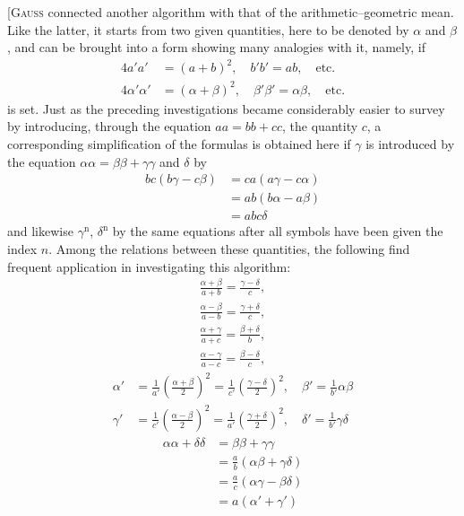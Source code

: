 
[\textsc{Gauss} connected another algorithm with that of the arithmetic–geometric mean. Like the latter, it starts from two given quantities, here to be denoted by $\alpha$ and $\beta$, and can be brought into a form showing many analogies with it, namely, if
\[
\begin{aligned}
4a'a'&=(a+b)^2,\quad b'b'=ab,\quad\text{etc.}\\
4\alpha'\alpha'&=(\alpha+\beta)^2,\quad\beta'\beta'=\alpha\beta,\quad\text{etc.}
\end{aligned}
\]
is set. Just as the preceding investigations became considerably easier to survey by introducing, through the equation $aa=bb+cc$, the quantity $c$, a corresponding simplification of the formulas is obtained here if
$\gamma$ is introduced by the equation $\alpha\alpha=\beta\beta+\gamma\gamma$ and $\delta$ by
\[
\begin{aligned}bc(b\gamma-c\beta)&=ca(a\gamma-c\alpha)\\&=ab(b\alpha-a\beta)\\&=abc\delta\end{aligned}
\]
and likewise $\gamma^{\mathrm n}$, $\delta^{\mathrm n}$ by the same equations after all symbols have been given the index $n$. Among the relations between these quantities, the following find frequent application in investigating this algorithm:
\[
\begin{gathered}\frac{\alpha+\beta}{a+b}=\frac{\gamma-\delta}{c},\\[5pt]
\frac{\alpha-\beta}{a-b}=\frac{\gamma+\delta}{c},\\[5pt]
\frac{\alpha+\gamma}{a+c}=\frac{\beta+\delta}{b},\\[5pt]
\frac{\alpha-\gamma}{a-c}=\frac{\beta-\delta}{c},\end{gathered}
\]
\[
\begin{aligned}
\alpha'&=\frac1{a'}\left(\frac{\alpha+\beta}{2}\right)^2
=\frac1{c'}\left(\frac{\gamma-\delta}{2}\right)^2,\quad
\beta'=\frac1{b'}\alpha\beta\\
\gamma'&=\frac1{c'}\left(\frac{\alpha-\beta}{2}\right)^2
=\frac1{a'}\left(\frac{\gamma+\delta}{2}\right)^2,\quad
\delta'=\frac1{b'}\gamma\delta
\end{aligned}
\]
\[
\begin{aligned}\alpha\alpha+\delta\delta&=\beta\beta+\gamma\gamma
\\&=\frac ab(\alpha\beta+\gamma\delta)\\&=\frac ac(\alpha\gamma-\beta\delta)
\\&=a(\alpha'+\gamma')\end{aligned}
\]
